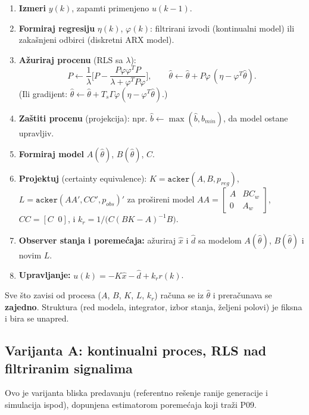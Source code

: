 \documentclass[11pt,a4paper,parskip=half,headsepline,numbers=noenddot]{scrartcl}
\begin{document}
\begin{enumerate}
\def\labelenumi{\arabic{enumi}.}
\item \textbf{Izmeri} \(y(k)\), zapamti primenjeno \(u(k-1)\).
\item \textbf{Formiraj regresiju} \(\eta(k)\), \(\varphi(k)\): filtrirani izvodi (kontinualni model) ili zakašnjeni odbirci (diskretni ARX model).
\item \textbf{Ažuriraj procenu} (RLS sa \(\lambda\)):
  \[P \leftarrow \frac1\lambda\Big[P - \frac{P\varphi\varphi^TP}{\lambda + \varphi^TP\varphi}\Big],\qquad \hat\theta \leftarrow \hat\theta + P\varphi\,(\eta - \varphi^T\hat\theta).\]
  (Ili gradijent: \(\hat\theta \leftarrow \hat\theta + T_s\Gamma\varphi(\eta - \varphi^T\hat\theta)\).)
\item \textbf{Zaštiti procenu} (projekcija): npr. \(\hat b \leftarrow \max(\hat b, b_{min})\), da model ostane upravljiv.
\item \textbf{Formiraj model} \(A(\hat\theta)\), \(B(\hat\theta)\), \(C\).
\item \textbf{Projektuj} (certainty equivalence): \(K = \texttt{acker}(A, B, p_{reg})\), \(L = \texttt{acker}(AA', CC', p_{obs})'\) za prošireni model \(AA = \begin{bmatrix}A & BC_w\\ 0 & A_w\end{bmatrix}\), \(CC = [C\;\; 0]\), i \(k_r = 1/\big(C(BK - A)^{-1}B\big)\).
\item \textbf{Observer stanja i poremećaja:} ažuriraj \(\hat x\) i \(\hat d\) sa modelom \(A(\hat\theta)\), \(B(\hat\theta)\) i novim \(L\).
\item \textbf{Upravljanje:} \(u(k) = -K\hat x - \hat d + k_rr(k)\).
\end{enumerate}

\begin{kljucna}
Sve što zavisi od procesa (\(A\), \(B\), \(K\), \(L\), \(k_r\)) računa se iz \(\hat\theta\) i preračunava se \textbf{zajedno}. Struktura (red modela, integrator, izbor stanja, željeni polovi) je fiksna i bira se unapred.
\end{kljucna}

\subsection{Varijanta A: kontinualni proces, RLS nad filtriranim signalima}

Ovo je varijanta bliska predavanju (referentno rešenje ranije generacije i simulacija ispod), dopunjena estimatorom poremećaja koji traži P09.
\end{document}
